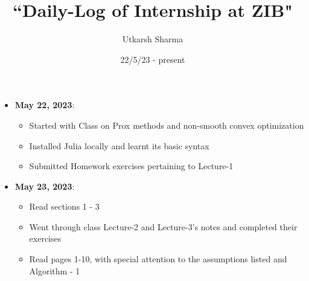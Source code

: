 \documentclass[a4paper,11pt,fleqn]{article}
\theoremstyle{plain}{\theorembodyfont{\rmfamily}%
\newtheorem{conjecture}[theorem]{Conjecture}}
\theoremstyle{plain}{\theorembodyfont{\rmfamily}%
\newtheorem{example}[theorem]{Example}}
\theoremstyle{plain}{\theorembodyfont{\rmfamily}%
\newtheorem{remark}[theorem]{Remark}}
\theoremstyle{plain}{\theorembodyfont{\rmfamily}%
\newtheorem{algorithm}[theorem]{Algorithm}}
\theoremstyle{plain}{\theorembodyfont{\rmfamily}%
\newtheorem{condition}[theorem]{Condition}}
\theoremstyle{plain}{\theorembodyfont{\rmfamily}%
\newtheorem{definition}[theorem]{Definition}}
\theoremstyle{plain}{\theorembodyfont{\rmfamily}
\newtheorem{fact}[theorem]{Fact}}
\theoremstyle{plain}{\theorembodyfont{\rmfamily}
\newtheorem{problem}[theorem]{Problem}}
\theoremstyle{plain}{\theorembodyfont{\rmfamily}
\newtheorem{notation}[theorem]{Notation}}
\theoremstyle{plain}{\theorembodyfont{\rmfamily}
\newtheorem{project}[theorem]{Project}}
\begin{document}
\title{``Daily-Log of Internship at ZIB"}
\author{Utkarsh Sharma}
\date{22/5/23 - present}
\maketitle 
\begin{itemize}
\item {\bf May 22, 2023}: 
\begin{itemize} 
\item Started with Class on Prox methods and non-smooth convex optimization
\item Installed Julia locally and learnt its basic syntax
\item Submitted Homework exercises pertaining to Lecture-1
\end{itemize}
\item {\bf May 23, 2023}:
\begin{itemize} 
\item Read \cite{drusvyatskiy_proximal} sections 1 - 3
\item Went through class Lecture-2 and Lecture-3's notes and completed their exercises
\item Read \cite{Johnstone2020projective} pages 1-10, with special attention to the assumptions listed and Algorithm - 1

\end{itemize}\textbf{}

\end{itemize}



\end{document}

